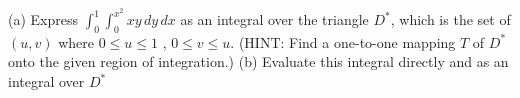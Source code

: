 (a) Express  \( \int_0^1 \int_0^{x^2} xy \, dy \,dx \) as an integral over the triangle \( D^* \), which is the set of \( (u, v) \) where
\( 0 \leq u \leq 1 \) , \( 0 \leq v \leq u \). (HINT: Find a one-to-one mapping \( T \) of \( D^* \) onto the given region of integration.)
(b) Evaluate this integral directly and as an integral over \( D^* \)
